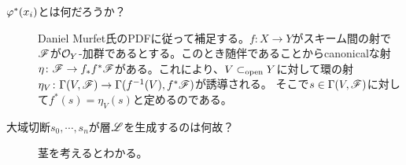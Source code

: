 
\begin{rem} ${}$
  \begin{description}
    \item[${\varphi}^*(x_i)$とは何だろうか？]  Daniel Murfet氏のPDF\cite{RisingSea}に従って補足する。$f \colon X \to Y$がスキーム間の射で$\mathscr{F}$が$\mathcal{O}_Y$-加群であるとする。このとき随伴であることからcanonicalな射$\eta \colon \mathscr{F} \to f_* f^* \mathscr{F}$がある。これにより、$V \subset_{\text{open}} Y$に対して環の射$\eta_V \colon {\Gamma}(V, \mathscr{F}) \to {\Gamma}(f^{-1}(V), f^*\mathscr{F})$が誘導される。
    そこで$s \in  {\Gamma}(V, \mathscr{F})$に対して$f^*(s) = \eta_V(s)$と定めるのである。
    \item[大域切断$s_0, \cdots , s_n$が層$\mathscr{L}$を生成するのは何故？]
    茎を考えるとわかる。
  \end{description}

\end{rem}
